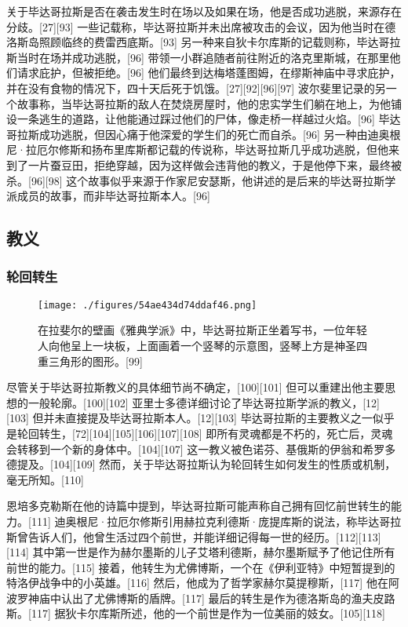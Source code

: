 关于毕达哥拉斯是否在袭击发生时在场以及如果在场，他是否成功逃脱，来源存在分歧。[27][93] 一些记载称，毕达哥拉斯并未出席被攻击的会议，因为他当时在德洛斯岛照顾临终的费雷西底斯。[93] 另一种来自狄卡尔库斯的记载则称，毕达哥拉斯当时在场并成功逃脱，[96] 带领一小群追随者前往附近的洛克里斯城，在那里他们请求庇护，但被拒绝。[96] 他们最终到达梅塔蓬图姆，在缪斯神庙中寻求庇护，并在没有食物的情况下，四十天后死于饥饿。[27][92][96][97] 波尔斐里记录的另一个故事称，当毕达哥拉斯的敌人在焚烧房屋时，他的忠实学生们躺在地上，为他铺设一条逃生的道路，让他能通过踩过他们的尸体，像走桥一样越过火焰。[96] 毕达哥拉斯成功逃脱，但因心痛于他深爱的学生们的死亡而自杀。[96] 另一种由迪奥根尼·拉厄尔修斯和扬布里库斯都记载的传说称，毕达哥拉斯几乎成功逃脱，但他来到了一片蚕豆田，拒绝穿越，因为这样做会违背他的教义，于是他停下来，最终被杀。[96][98] 这个故事似乎来源于作家尼安瑟斯，他讲述的是后来的毕达哥拉斯学派成员的故事，而非毕达哥拉斯本人。[96]
\subsection{教义}  
\subsubsection{轮回转生}
\begin{figure}[ht]
\centering
\texttt{[image: ./figures/54ae434d74ddaf46.png]}
\caption{在拉斐尔的壁画《雅典学派》中，毕达哥拉斯正坐着写书，一位年轻人向他呈上一块板，上面画着一个竖琴的示意图，竖琴上方是神圣四重三角形的图形。[99]} \label{fig_Pythag_7}
\end{figure}
尽管关于毕达哥拉斯教义的具体细节尚不确定，[100][101] 但可以重建出他主要思想的一般轮廓。[100][102] 亚里士多德详细讨论了毕达哥拉斯学派的教义，[12][103] 但并未直接提及毕达哥拉斯本人。[12][103] 毕达哥拉斯的主要教义之一似乎是轮回转生，[72][104][105][106][107][108] 即所有灵魂都是不朽的，死亡后，灵魂会转移到一个新的身体中。[104][107] 这一教义被色诺芬、基俄斯的伊翁和希罗多德提及。[104][109] 然而，关于毕达哥拉斯认为轮回转生如何发生的性质或机制，毫无所知。[110]

恩培多克勒斯在他的诗篇中提到，毕达哥拉斯可能声称自己拥有回忆前世转生的能力。[111] 迪奥根尼·拉厄尔修斯引用赫拉克利德斯·庞提库斯的说法，称毕达哥拉斯曾告诉人们，他曾生活过四个前世，并能详细记得每一世的经历。[112][113][114] 其中第一世是作为赫尔墨斯的儿子艾塔利德斯，赫尔墨斯赋予了他记住所有前世的能力。[115] 接着，他转生为尤佛博斯，一个在《伊利亚特》中短暂提到的特洛伊战争中的小英雄。[116] 然后，他成为了哲学家赫尔莫提穆斯，[117] 他在阿波罗神庙中认出了尤佛博斯的盾牌。[117] 最后的转生是作为德洛斯岛的渔夫皮路斯。[117] 据狄卡尔库斯所述，他的一个前世是作为一位美丽的妓女。[105][118]
